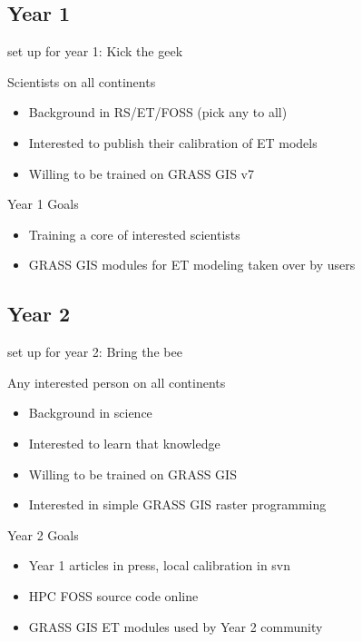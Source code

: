 \documentclass[xcolor=dvipsnames,beamer]{beamer} %
\begin{document}
\subsection{Year 1}
\begin{frame}[fragile]{set up for year 1: Kick the geek}

Scientists on all continents
\begin{itemize}
 \item Background in RS/ET/FOSS (pick any to all)
 \item Interested to publish their calibration of ET models
 \item Willing to be trained on GRASS GIS v7
\end{itemize}


\begin{block}{Year 1 Goals}
\begin{itemize}
 \item Training a core of interested scientists
 \item GRASS GIS modules for ET modeling taken over by users
\end{itemize}
\end{block}

\end{frame}

\subsection{Year 2}
\begin{frame}[fragile]{set up for year 2: Bring the bee}

Any interested person on all continents
\begin{itemize}
 \item Background in science
 \item Interested to learn that knowledge
 \item Willing to be trained on GRASS GIS
 \item Interested in simple GRASS GIS raster programming
\end{itemize}

\begin{block}{Year 2 Goals}
\begin{itemize}
 \item Year 1 articles in press, local calibration in svn
 \item HPC FOSS source code online
 \item GRASS GIS ET modules used by Year 2 community
\end{itemize}
\end{block}

\end{frame}
\end{document}
